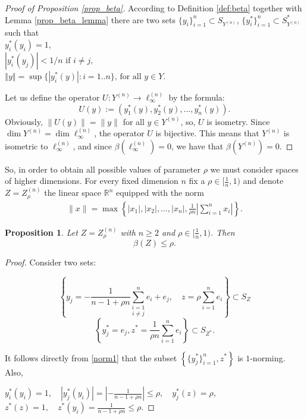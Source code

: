 \documentclass[11pt,a4paper]{amsart}
\newcommand{\R}{{\mathbb{R}}}
\newcommand{\norm}[1]{\left\Vert#1\right\Vert}
\numberwithin{equation}{section}
\theoremstyle{plain}
\newtheorem{prop}[theorem]{Proposition}
\theoremstyle{definition}
\renewcommand{\leq}{\leqslant}
\renewcommand{\ge}{\geqslant}
\begin{document}
\begin{proof}[Proof of Proposition \ref{prop_beta}]
According to  Definition \ref{def:beta} together with Lemma \ref{prop_beta_lemma} there are two sets $\{y_i\}_{i=1}^{n}\subset S_{Y^{(n)}}$, $\{y^*_i\}_{i=1}^{n}\subset S^*_{Y^{(n)}}$ such that \\
$y^*_i(y_i) = 1,$\\
$|y^*_i(y_j)| < 1/n \text{ if } i \neq j,$\\
$\norm{y} = \sup\{|y_i^*(y)|: i=1..n\} \text{, for all } y\in Y.$

Let us define the operator $U: Y^{(n)}\rightarrow \ell_\infty^{(n)}$ by the formula:
$$U(y):=(y_1^*(y), y_2^*(y),...,y_n^*(y)).$$
Obviously, $\|U(y)\|=\|y\|$ for all $y\in Y^{(n)}$, so, $U$ is isometry. Since $\dim Y^{(n)} =\dim \ell_\infty^{(n)}$, the operator $U$ is bijective. This means that $Y^{(n)} $ is isometric to $\ell_\infty^{(n)}$, and since $\beta(\ell_\infty^{(n)})=0$, we have that $\beta(Y^{(n)})=0$.
\end{proof}

So, in order to obtain all possible values of parameter $\rho$ we must consider spaces of higher dimensions.
For every fixed dimension $n$ fix a $\rho\in [\frac{1}{n}, 1)$ and denote $Z=Z^{(n)}_\rho$ the linear space $\R^n$ equipped with the norm 
\begin{align}\label{norm1}
\|x\| =\max\left\{|x_1|, | x_2|,...,| x_n|, \frac{1}{\rho n} \left|\sum \limits_{i=1}^{n} x_i \right|\right\}.
\end{align}


\begin{prop}
Let $Z=Z^{(n)}_\rho$ with $n \ge 2$ and $\rho\in [\frac{1}{n}, 1)$. Then
$$\beta(Z)\leq\rho.$$
\end{prop}

\begin{proof} 
Consider two sets: 

$$\left\{y_j =-\frac{1}{n-1+\rho n}\underset{i\neq j}{\sum \limits_{i=1}^{n}}e_i + e_j, \quad z=\rho\sum \limits_{i=1}^{n}e_i \right\}\subset S_Z$$
  $$\left\{y_j^* = e_j, z^*=\frac{1}{\rho n}\sum \limits_{i=1}^{n}e_i\right\}\subset S_{Z^*}.$$

It follows directly from  \eqref{norm1} that the subset $\left\{\{y_j^*\}^n_{i=1}, z^*\right\}$ is $1$-norming. Also,

$y^*_i(y_i)=1, \quad |y^*_j(y_i)| = |-\frac{1}{n-1+\rho n}|\leq \rho, \quad y^*_j(z) = \rho$,
$z^*(z)=1, \quad z^*(y_i) =\frac{1}{n-1+\rho n}\leq \rho$.
\end{proof}
\end{document}

